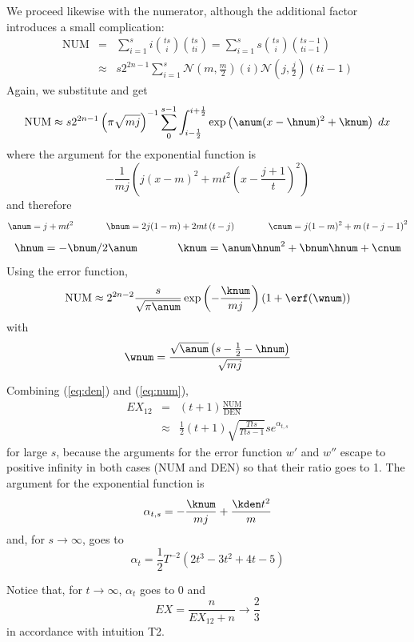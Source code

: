 \documentclass[phd,12pt,oneside]{ubcthesis}
\begin{document}
We proceed likewise with the numerator, although the additional factor
introduces a small complication:
  \begin{eqnarray*}
  \mbox{NUM}&=&\sum_{i=1}^{s}i\binom{ts}{i}\binom{ts}{ti}=\sum_{i=1}^{s}s\binom{ts}{i}\binom{ts-1}{ti-1}\\
&\approx&s2^{2n-1}\sum_{i=1}^{s}\mathcal{N}\left(m,\frac{m}{2}\right)(i)\mathcal{N}\left(j,\frac{j}{2}\right)(ti-1)
\end{eqnarray*}
Again, we substitute and get
\begin{equation}
  \label{eq:iuloogho}
  \mbox{NUM}\approx{}s2^{2n-1}\left(\pi\sqrt{mj}\right)^{-1}\sum_{0}^{s-1}\int_{i-\frac{1}{2}}^{i+\frac{1}{2}}\exp\left({\anum}(x-{\hnum})^{2}+{\knum}\right)\;{}dx
\end{equation}
where the argument for the exponential function is
\begin{equation}
  \label{eq:yaekituk}
  -\frac{1}{mj}\left(j(x-m)^{2}+mt^{2}\left(x-\frac{j+1}{t}\right)^{2}\right)
\end{equation}
and therefore
\begin{equation}
  \label{eq:eyeangie}
{\anum}=j+mt^{2}\hspace{.5in}
{\bnum}=2j(1-m)+2mt\left(t-j\right)\hspace{.5in}
{\cnum}=j(1-m)^{2}+m\left(t-j-1\right)^{2}
\end{equation}
\begin{equation}
  \label{eq:ohghaeni}
{\hnum}=-{\bnum}/2{\anum}\hspace{.5in}
{\knum}={\anum}{\hnum}^{2}+{\bnum}{\hnum}+{\cnum}
\end{equation}
Using the error function, 
\begin{equation}
  \label{eq:num}
  \mbox{NUM}\approx{}2^{2n-2}\frac{s}{\sqrt{\pi{}{\anum}}}\exp\left(-\frac{{\knum}}{mj}\right)\left(1+\erf({\wnum})\right)
\end{equation}
with
\begin{equation}
  \label{eq:nahngeil}
  {\wnum}=\frac{\sqrt{{\anum}}\left(s-\frac{1}{2}-{\hnum}\right)}{\sqrt{mj}}
\end{equation}

{\noindent}Combining ({\ref{eq:den}}) and ({\ref{eq:num}}),
\begin{eqnarray*}
  EX_{12}&=&(t+1)\frac{\mbox{NUM}}{\mbox{DEN}}\\
&\approx&\frac{1}{2}(t+1)\sqrt{\frac{{T}{}ts}{{T}{}ts-1}}se^{\alpha_{t,s}}
\end{eqnarray*}
for large $s$, because the arguments for the error function $w'$ and
$w''$ escape to positive infinity in both cases (NUM and DEN) so that
their ratio goes to 1. The argument for the exponential function is
\begin{equation}
  \label{eq:beefadao}
  \alpha_{t,s}=-\frac{{\knum}}{mj}+\frac{{\kden}t^{2}}{m}
\end{equation}
and, for $s\rightarrow\infty$, goes to
\begin{equation}
  \label{eq:chuhohng}
  \alpha_{t}=\frac{1}{2}{T}^{-2}(2t^{3}-3t^{2}+4t-5)
\end{equation}

{\noindent}Notice that, for $t\rightarrow\infty$, $\alpha_{t}$ goes to $0$ and
\begin{equation}
  \label{eq:oobeadoo}
  EX=\frac{n}{EX_{12}+n}\rightarrow\frac{2}{3}
\end{equation}
in accordance with intuition T2.
\end{document}
